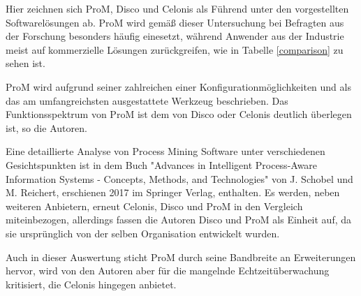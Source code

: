 Hier zeichnen sich ProM, Disco und Celonis als Führend unter den vorgestellten Softwarelösungen ab. ProM wird gemäß dieser Untersuchung bei Befragten aus der Forschung besonders häufig einesetzt, während Anwender aus der Industrie meist auf kommerzielle Lösungen zurückgreifen, wie in Tabelle \ref{comparison} zu sehen ist.

\begin{table}[!h]
\centering
{}
\caption{Angaben von Anwendern zu ihrem Umgang mit Process Mining Software (Quelle: Auszug aus Tabelle 5: Fragenkatalog 5, Verstraete, Comparative Study of Process Mining Software, S. 29 \cite{compPM} }
\label{comparison}
\end{table}

\normalsize
ProM wird aufgrund seiner zahlreichen einer Konfigurationmöglichkeiten und als das am umfangreichsten ausgestattete Werkzeug beschrieben. Das Funktionsspektrum von ProM ist dem von Disco oder Celonis deutlich überlegen ist, so die Autoren. 

Eine detaillierte Analyse von Process Mining Software unter verschiedenen Gesichtspunkten ist in dem Buch "Advances in Intelligent Process-Aware Information Systems - Concepts, Methods, and Technologies" von J. Schobel und M.  Reichert, erschienen 2017 im Springer Verlag, enthalten\cite{Schobel2017}. Es werden, neben weiteren Anbietern, erneut Celonis, Disco und ProM in den Vergleich miteinbezogen, allerdings fassen die Autoren Disco und ProM als Einheit auf, da sie ursprünglich von der selben Organisation entwickelt wurden. 

Auch in dieser Auswertung sticht ProM durch seine Bandbreite an Erweiterungen hervor, wird von den Autoren aber für die mangelnde Echtzeitüberwachung kritisiert, die Celonis hingegen anbietet.

